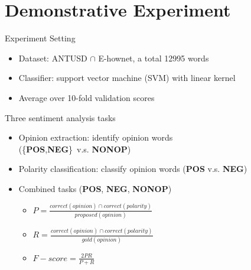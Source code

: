 \documentclass[compress]{beamer}
\begin{document}
\section{Demonstrative Experiment}
    \begin{frame}{\secname}
        \begin{block}{Experiment Setting}
            \begin{itemize}
                \item Dataset: ANTUSD $\cap$ E-hownet, a total 12995 words
                \item Classifier: support vector machine (SVM) with linear kernel
                \item Average over 10-fold validation scores
            \end{itemize}
        \end{block}
        \pause
        \begin{block}{Three sentiment analysis tasks}
            \begin{itemize}
                \item Opinion extraction: identify opinion words \\ (\{\textbf{POS},\textbf{NEG}\}\ v.s. \textbf{NONOP})
                \item Polarity classification: classify opinion words (\textbf{POS} v.s. \textbf{NEG})
                \item Combined tasks (\textbf{POS}, \textbf{NEG}, \textbf{NONOP})
                \begin{itemize}
                    \item $P=\frac{correct(opinion) \cap correct(polarity)}{proposed(opinion)}$
                    \item $R=\frac{correct(opinion) \cap correct(polarity)}{gold(opinion)}$
                    \item $F-score = \frac{2PR}{P+R}$
                \end{itemize}
            \end{itemize}
        \end{block}
    \end{frame}
\end{document}
